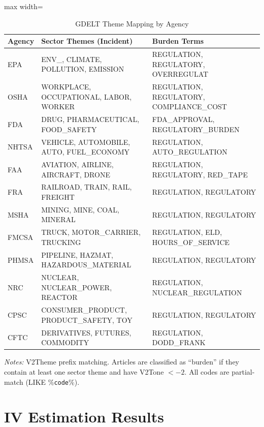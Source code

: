 \documentclass[12pt]{article}
\begin{document}
\begin{table}[H]
\centering
\caption{GDELT Theme Mapping by Agency}
\label{tab:themes}
\begin{adjustbox}{max width=\textwidth}
\begin{threeparttable}
\begin{tabular}{lll}
\toprule
Agency & Sector Themes (Incident) & Burden Terms \\
\midrule
EPA & ENV\_, CLIMATE, POLLUTION, EMISSION & REGULATION, REGULATORY, OVERREGULAT \\
OSHA & WORKPLACE, OCCUPATIONAL, LABOR, WORKER & REGULATION, REGULATORY, COMPLIANCE\_COST \\
FDA & DRUG, PHARMACEUTICAL, FOOD\_SAFETY & FDA\_APPROVAL, REGULATORY\_BURDEN \\
NHTSA & VEHICLE, AUTOMOBILE, AUTO, FUEL\_ECONOMY & REGULATION, AUTO\_REGULATION \\
FAA & AVIATION, AIRLINE, AIRCRAFT, DRONE & REGULATION, REGULATORY, RED\_TAPE \\
FRA & RAILROAD, TRAIN, RAIL, FREIGHT & REGULATION, REGULATORY \\
MSHA & MINING, MINE, COAL, MINERAL & REGULATION, REGULATORY \\
FMCSA & TRUCK, MOTOR\_CARRIER, TRUCKING & REGULATION, ELD, HOURS\_OF\_SERVICE \\
PHMSA & PIPELINE, HAZMAT, HAZARDOUS\_MATERIAL & REGULATION, REGULATORY \\
NRC & NUCLEAR, NUCLEAR\_POWER, REACTOR & REGULATION, NUCLEAR\_REGULATION \\
CPSC & CONSUMER\_PRODUCT, PRODUCT\_SAFETY, TOY & REGULATION, REGULATORY \\
CFTC & DERIVATIVES, FUTURES, COMMODITY & REGULATION, DODD\_FRANK \\
\bottomrule
\end{tabular}
\begin{tablenotes}
\small
\item \textit{Notes:} V2Theme prefix matching. Articles are classified as ``burden'' if they contain at least one sector theme and have V2Tone $< -2$. All codes are partial-match (LIKE \%\texttt{code}\%).
\end{tablenotes}
\end{threeparttable}
\end{adjustbox}
\end{table}

\section{IV Estimation Results}
\label{app:iv}
\end{document}
